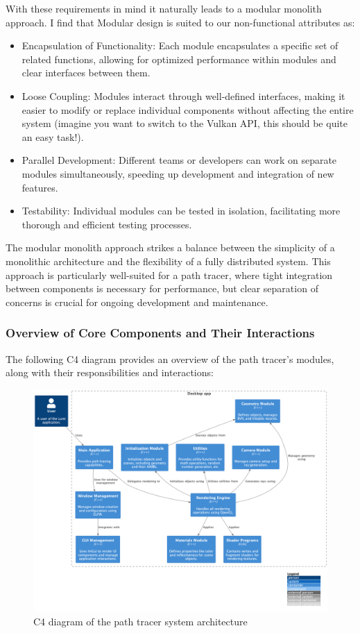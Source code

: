 \documentclass[12pt]{article}
\begin{document}
With these requirements in mind it naturally leads to a modular monolith approach. I find that Modular design is suited to our non-functional attributes as:

\begin{itemize}
    \item Encapsulation of Functionality: Each module encapsulates a specific set of related functions, allowing for optimized performance within modules and clear interfaces between them.
    \item Loose Coupling: Modules interact through well-defined interfaces, making it easier to modify or replace individual components without affecting the entire system (imagine you want to switch to the Vulkan API, this should be quite an easy task!).
    \item Parallel Development: Different teams or developers can work on separate modules simultaneously, speeding up development and integration of new features.
    \item Testability: Individual modules can be tested in isolation, facilitating more thorough and efficient testing processes.
\end{itemize}

The modular monolith approach strikes a balance between the simplicity of a monolithic architecture and the flexibility of a fully distributed system. This approach is particularly well-suited for a path tracer, where tight integration between components is necessary for performance, but clear separation of concerns is crucial for ongoing development and maintenance.

\subsubsection{Overview of Core Components and Their Interactions}

The following C4 diagram provides an overview of the path tracer's modules, along with their responsibilities and interactions:

\begin{figure}[H]
    \centering
    \includegraphics[width=\textwidth]{images/lumi_pml.png}
    \caption{C4 diagram of the path tracer system architecture}
    \label{fig:c4-diagram}
\end{figure}
\end{document}
